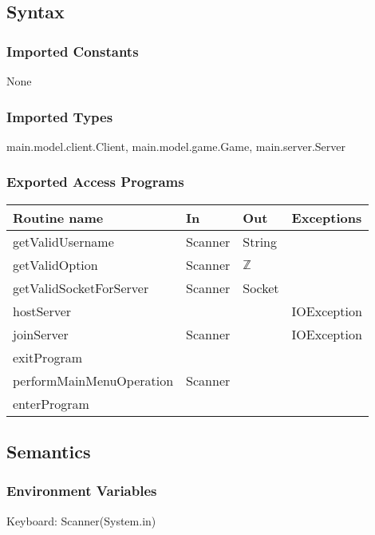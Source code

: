 \documentclass[12pt, titlepage]{article}
\begin{document}
    \subsection* {Syntax}
    
        \subsubsection* {Imported Constants}
            None
        \subsubsection* {Imported Types}
            main.model.client.Client, main.model.game.Game, main.server.Server
        \subsubsection* {Exported Access Programs}
        
        \begin{tabular}{| l | l | l | p{5cm} |}
            \hline
            \textbf{Routine name} & \textbf{In} & \textbf{Out} & \textbf{Exceptions}\\
            \hline
            getValidUsername & Scanner & String &\\
            \hline
            getValidOption & Scanner & $\mathbb{Z}$ &\\
            \hline 
            getValidSocketForServer & Scanner & Socket &\\
            \hline 
            hostServer & & & IOException\\
            \hline 
            joinServer & Scanner & & IOException\\
            \hline 
            exitProgram & & &\\
            \hline 
            performMainMenuOperation & Scanner & &\\
            \hline 
            enterProgram & & &\\
            \hline 
        \end{tabular}
        
    \subsection* {Semantics}
    
    \subsubsection* {Environment Variables}
        Keyboard: Scanner(System.in)
        
\end{document}
